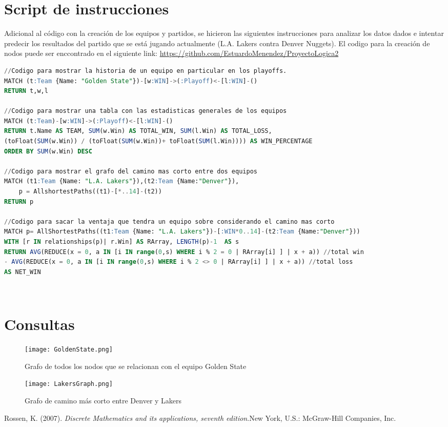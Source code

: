\documentclass[a4paper, 11pt]{article}
\begin{document}
\section*{Script de instrucciones}
Adicional al código con la creación de los equipos y partidos, se hicieron las siguientes instrucciones para analizar los datos dados e intentar predecir los resultados del partido que se está jugando actualmente (L.A. Lakers contra Denver Nuggets). El codigo para la creación de nodos puede ser enccontrado en el siguiente link: \url{https://github.com/EstuardoMenendez/ProyectoLogica2}
\begin{lstlisting}[language=SQL]
//Codigo para mostrar la historia de un equipo en particular en los playoffs.
MATCH (t:Team {Name: "Golden State"})-[w:WIN]->(:Playoff)<-[l:WIN]-()
RETURN t,w,l

//Codigo para mostrar una tabla con las estadisticas generales de los equipos
MATCH (t:Team)-[w:WIN]->(:Playoff)<-[l:WIN]-()
RETURN t.Name AS TEAM, SUM(w.Win) AS TOTAL_WIN, SUM(l.Win) AS TOTAL_LOSS,
(toFloat(SUM(w.Win)) / (toFloat(SUM(w.Win))+ toFloat(SUM(l.Win)))) AS WIN_PERCENTAGE
ORDER BY SUM(w.Win) DESC

//Codigo para mostrar el grafo del camino mas corto entre dos equipos
MATCH (t1:Team {Name: "L.A. Lakers"}),(t2:Team {Name:"Denver"}),
    p = AllshortestPaths((t1)-[*..14]-(t2))
RETURN p

//Codigo para sacar la ventaja que tendra un equipo sobre considerando el camino mas corto
MATCH p= AllShortestPaths((t1:Team {Name: "L.A. Lakers"})-[:WIN*0..14]-(t2:Team {Name:"Denver"}))
WITH [r IN relationships(p)| r.Win] AS RArray, LENGTH(p)-1  AS s
RETURN AVG(REDUCE(x = 0, a IN [i IN range(0,s) WHERE i % 2 = 0 | RArray[i] ] | x + a)) //total win
- AVG(REDUCE(x = 0, a IN [i IN range(0,s) WHERE i % 2 <> 0 | RArray[i] ] | x + a)) //total loss
AS NET_WIN
\end{lstlisting}
\\
\section*{Consultas}
\begin{figure}[h!]
        \centering
        \texttt{[image: GoldenState.png]}
        \caption{Grafo de todos los nodos que se relacionan con el equipo Golden State}
\end{figure}
\begin{figure}[h!]
        \centering
        \texttt{[image: LakersGraph.png]}
        \caption{Grafo de camino más corto entre Denver y Lakers}
\end{figure}
\begin{thebibliography}{1} %
 Rossen, K. (2007). \textit{Discrete Mathematics and its applications, seventh edition}.New York, U.S.: McGraw-Hill Companies, Inc.
\end{thebibliography}
\end{document}
